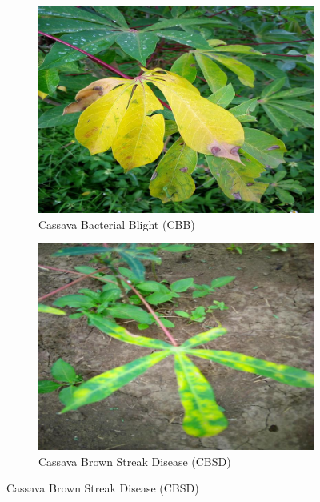 \documentclass[a4paper,12pt]{article}
\begin{document}
\begin{figure}[H]
    \centering
    \begin{subfigure}{0.45\textwidth}
        \centering
        \includegraphics[width=\textwidth]{assets/class_images/class_0.jpg}
        \caption{Cassava Bacterial Blight (CBB)}
    \end{subfigure}\hfill
    \begin{subfigure}{0.45\textwidth}
        \centering
        \includegraphics[width=\textwidth]{assets/class_images/class_1.jpg}
        \caption{Cassava Brown Streak Disease (CBSD)}
    \end{subfigure}
    
    \vspace{0.5cm}
    

\end{figure}
\end{document}
